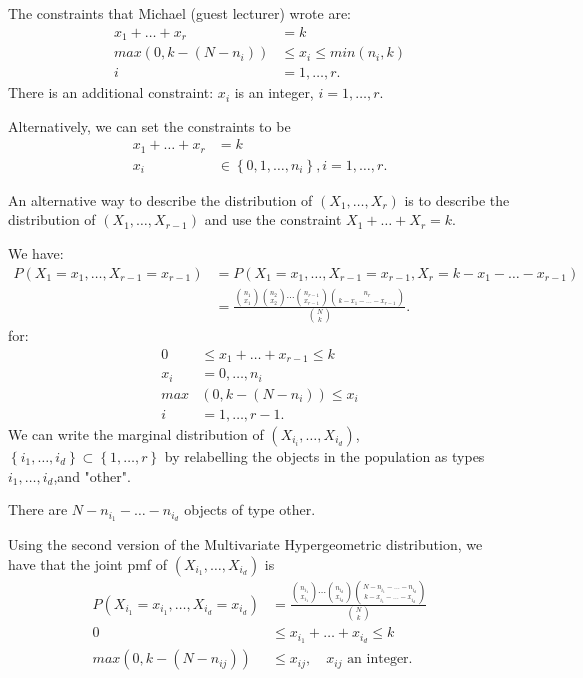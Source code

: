 
\begin{remark}
	The constraints that Michael (guest lecturer) wrote are: 
	\begin{align*}
		x_1 + \ldots+ x_{r} &=  k \\
		max(0, k - \left( N - n_i \right) ) &\le x_{i} \le min\left( n_{i}, k \right) \\
		i &= 1, \ldots, r
	.\end{align*}
	There is an additional constraint: $x_{i} $ is an integer, $i = 1, \ldots, r$.

	Alternatively, we can set the constraints to be 
	\begin{align*}
		x_1 + \ldots + x_r &= k \\
		x_{i} &\in  \left\{ 0, 1, \ldots, n_{i} \right\} , i = 1, \ldots, r
	.\end{align*}
\end{remark}

An alternative way to describe the distribution of $\left( X_1, \ldots, X_{r} \right) $ is to describe the distribution of $\left( X_1, \ldots, X_{r-1} \right) $ and use the constraint $X_1 + \ldots + X_{r} = k$. 

We have:
\begin{align*}
	P\left( X_1 = x_1, \ldots, X_{r-1} = x_{r-1} \right) &= P\left( X_1= x_1, \ldots, 
	X_{r-1} = x_{r-1}, X_r = k - x_1-\ldots-x_{r-1} \right)  \\
							     &=\frac{\binom{n_1}{x_1} \binom{n_2}{x_2} \cdots \binom{n_{r-1}}{x_{r-1}}  \binom{n_{r}}{k-x_1-\ldots-x_{r-1}}}{\binom{N}{k}}
.\end{align*}
for:
\begin{align*}
	0 &\le x_1 + \ldots + x_{r-1} \le k \\
	x_i &= 0, \ldots, n_{i} \\
	max&\left( 0, k-\left( N - n_{i} \right)  \right) \le x_{i}\\
	i &= 1, \ldots, r-1 
.\end{align*}
We can write the marginal distribution of $\left( X_{i_{i}}, \ldots, X_{i_{d}} \right) $, $\left\{ i_{1}, \ldots, i_{d} \right\}  \subset \left\{ 1, \ldots, r \right\} $ by relabelling the objects in the population as types $i_{1}, \ldots, i_{d}$,and "other". 

There are $N - n_{i_{1}} - \ldots - n_{i_{d}}$ objects of type other.

Using the second version of the Multivariate Hypergeometric distribution, we have that the joint pmf of $\left( X_{i_{1}}, \ldots, X_{i_{d}} \right) $ is 
\begin{align*}
	P\left( X_{i_{1}}= x_{i_{1}}, \ldots, X_{i_{d}} = x_{i_{d}} \right) 
	&= \frac{\binom{n_{i_{1}}}{x_{i_{1}}}  \cdots \binom{n_{i_{d}}}{x_{i_{d}}}  \binom{N - n_{i_{1}} - \ldots - n _{i_{d}}}{k-x_{i_{1}}-\ldots-x_{i_{d}}}}{\binom{N}{k}}
 \\
	0 &\le x_{i_{1}} + \ldots + x_{i_{d}} \le  k \\
	max\left( 0, k- \left( N - n_{ij} \right)  \right) &\le x_{ij}, \quad x_{ij} \text{ an integer}
.\end{align*}
